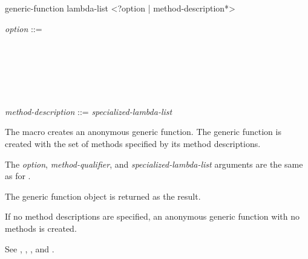 \begin{defmac}
generic-function lambda-list <?option | {method-description}*>

\begin{tabbing}
\emph{option\/} ::=  \\
~~~ \Mor~ \\
~~~ \Mor~ \\
~~~ \Mor~ \\
~~~ \Mor~ \\
~~~ \Mor~ \\\\
 \emph{method-description\/} ::=    \emph{specialized-lambda-list\/} 
\cd{)}
\end{tabbing}
The  macro creates an anonymous generic
function. The generic function is created with the set of methods
specified by its method descriptions.




The \emph{option}, \emph{method-qualifier}, and {\it
specialized-lambda-list\/} arguments are the same as for 
.


The generic function object is returned as the result.


If no method descriptions are specified, an anonymous generic function with no
methods is created.

See , , , and .
\end{defmac}


